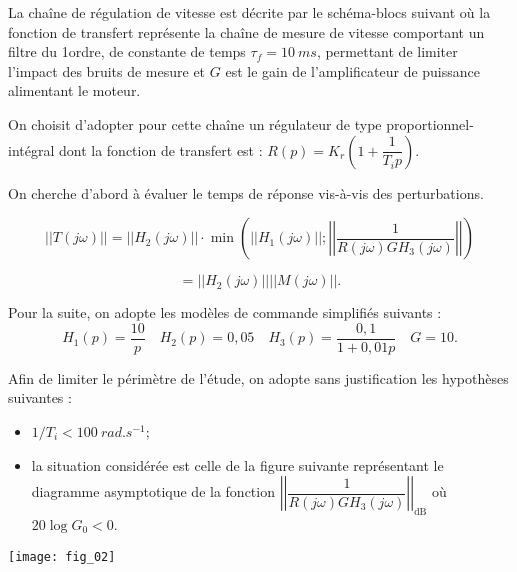 La chaîne de régulation de vitesse est décrite par le schéma-blocs suivant où la fonction de transfert représente la chaîne de mesure de vitesse comportant un filtre
du 1\ier ordre, de constante de temps $\tau_f = \SI{10}{ms}$, permettant de limiter
l’impact des bruits de mesure et $G$ est le gain de l’amplificateur de puissance
alimentant le moteur.

On choisit d’adopter pour cette chaîne un régulateur de type proportionnel-intégral
dont la fonction de transfert est : $R(p)=K_r\left(1+\dfrac{1}{T_i p}  \right)$.


On cherche d'abord à évaluer le temps de réponse vis-à-vis des perturbations. 


$$
|| T\left(j \omega\right) || = 
|| H_2\left(j \omega\right) || \cdot 
\min \left(
||H_1\left(j \omega\right)||; 
\left|\left| \dfrac{1}{R\left(j \omega\right)GH_3\left(j \omega\right)}\right|\right|\right)
$$

$$
= || H_2\left(j \omega\right) || || M\left(j \omega\right) ||.
$$


Pour la suite, on adopte les modèles de commande simplifiés suivants : 
$$
H_1(p)=\dfrac{10}{p} \quad
H_2(p)=0,05 \quad
H_3(p)=\dfrac{0,1}{1+0,01 p}\quad
G=10.
$$

Afin de limiter le périmètre de l’étude, on adopte sans justification les
hypothèses suivantes : 
\begin{itemize}
\item $1/T_i < \SI{100}{rad.s^{-1}}$;
\item la situation considérée est celle de la figure suivante représentant le diagramme asymptotique de la fonction 
$
\left|\left|\dfrac{1}{R\left(j \omega\right)GH_3\left(j \omega\right)}\right|\right|_{\text{dB}}
$ où $20\log G_0 < 0$.
\end{itemize}

\begin{marginfigure}
\texttt{[image: fig\_02]}
\end{marginfigure}

